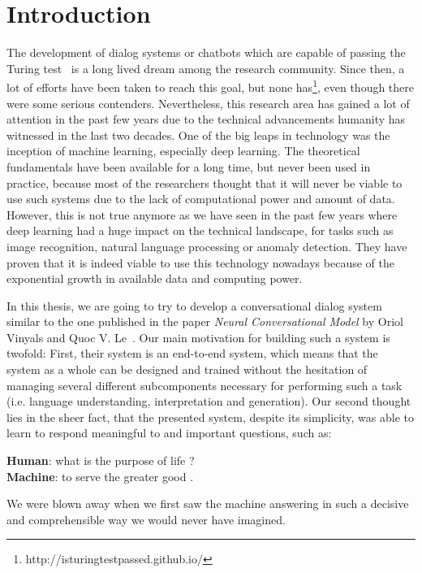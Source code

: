 \chapter{Introduction}
The development of dialog systems or chatbots which are capable of passing the Turing test~\cite{Turing:1950} is a long lived dream among the research community. Since then, a lot of efforts have been taken to reach this goal, but none has\footnote{http://isturingtestpassed.github.io/}, even though there were some serious contenders. Nevertheless, this research area has gained a lot of attention in the past few years due to the technical advancements humanity has witnessed in the last two decades. One of the big leaps in technology was the inception of machine learning, especially deep learning. The theoretical fundamentals have been available for a long time, but never been used in practice, because most of the researchers thought that it will never be viable to use such systems due to the lack of computational power and amount of data. However, this is not true anymore as we have seen in the past few years where deep learning had a huge impact on the technical landscape, for tasks such as image recognition, natural language processing or anomaly detection. They have proven that it is indeed viable to use this technology nowadays because of the exponential growth in available data and computing power.

In this thesis, we are going to try to develop a conversational dialog system similar to the one published in the paper \emph{Neural Conversational Model} by Oriol Vinyals and Quoc V. Le~\cite{Vinyals:2015}. Our main motivation for building such a system is twofold: First, their system is an end-to-end system, which means that the system as a whole can be designed and trained without the hesitation of managing several different subcomponents necessary for performing such a task (i.e. language understanding, interpretation and generation). Our second thought lies in the sheer fact, that the presented system, despite its simplicity, was able to learn to respond meaningful to and important questions, such as:

\begin{center}	
	\textbf{Human}: what is the purpose of life ?\\
	\textbf{Machine}: to serve the greater good .
\end{center}

We were blown away when we first saw the machine answering in such a decisive and comprehensible way we would never have imagined.

